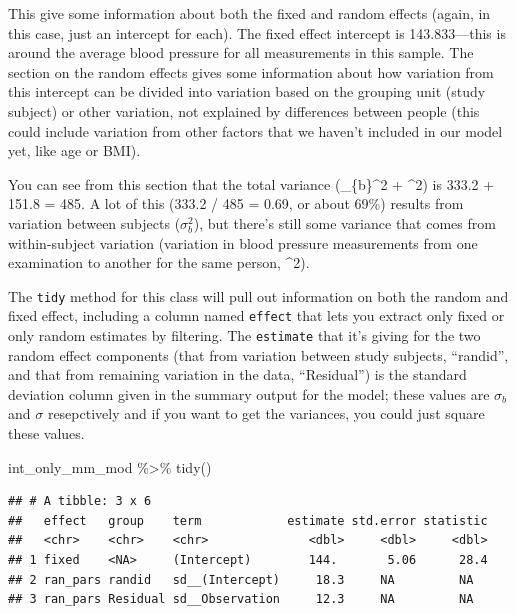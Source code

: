 \documentclass[
]{book}
\newenvironment{Shaded}{\begin{snugshade}}{\end{snugshade}}
\newcommand{\FunctionTok}[1]{\textcolor[rgb]{0.00,0.00,0.00}{#1}}
\newcommand{\NormalTok}[1]{#1}
\newcommand{\SpecialCharTok}[1]{\textcolor[rgb]{0.00,0.00,0.00}{#1}}
\begin{document}
This give some information about both the fixed and random effects (again, in
this case, just an intercept for each). The fixed effect intercept is
143.833---this is around the average blood pressure for all measurements in this
sample. The section on the random effects gives some information about
how variation from this intercept can be divided into variation based on the
grouping unit (study subject) or other variation, not explained by differences
between people (this could include variation from other
factors that we haven't included in our model yet, like age or BMI).

You can see from this section that the total variance (\sigma\_\{b\}\^{}2 + \sigma\^{}2)
is 333.2 + 151.8 = 485. A lot of this (333.2 / 485 = 0.69, or about 69\%) results
from variation between subjects (\(\sigma_{b}^2\)), but there's still some variance
that comes from within-subject variation (variation in blood pressure measurements
from one examination to another for the same person, \sigma\^{}2).

The \texttt{tidy} method for this class will pull out information on both the random
and fixed effect, including a column named \texttt{effect} that lets you extract only
fixed or only random estimates by filtering. The \texttt{estimate} that it's giving for
the two random effect components (that from variation between study subjects,
``randid'', and that from remaining variation in the data, ``Residual'') is the
standard deviation column given in the summary output for the model; these values
are \(\sigma_{b}\) and \(\sigma\) resepctively and if you want to get the variances,
you could just square these values.

\begin{Shaded}
\begin{Highlighting}[]
\NormalTok{int\_only\_mm\_mod }\SpecialCharTok{\%\textgreater{}\%}
  \FunctionTok{tidy}\NormalTok{()}
\end{Highlighting}
\end{Shaded}

\begin{verbatim}
## # A tibble: 3 x 6
##   effect   group    term            estimate std.error statistic
##   <chr>    <chr>    <chr>              <dbl>     <dbl>     <dbl>
## 1 fixed    <NA>     (Intercept)        144.       5.06      28.4
## 2 ran_pars randid   sd__(Intercept)     18.3     NA         NA  
## 3 ran_pars Residual sd__Observation     12.3     NA         NA
\end{verbatim}
\end{document}
